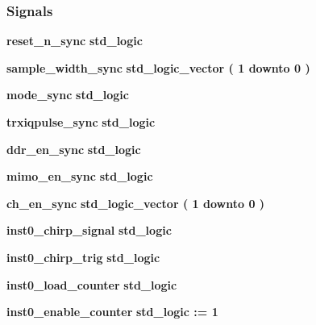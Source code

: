 \subsubsection*{Signals}
 \begin{DoxyCompactItemize}
\item 
{\bf reset\+\_\+n\+\_\+sync} {\bfseries \textcolor{comment}{std\+\_\+logic}\textcolor{vhdlchar}{ }} 
\item 
{\bf sample\+\_\+width\+\_\+sync} {\bfseries \textcolor{comment}{std\+\_\+logic\+\_\+vector}\textcolor{vhdlchar}{ }\textcolor{vhdlchar}{(}\textcolor{vhdlchar}{ }\textcolor{vhdlchar}{ } \textcolor{vhdldigit}{1} \textcolor{vhdlchar}{ }\textcolor{keywordflow}{downto}\textcolor{vhdlchar}{ }\textcolor{vhdlchar}{ } \textcolor{vhdldigit}{0} \textcolor{vhdlchar}{ }\textcolor{vhdlchar}{)}\textcolor{vhdlchar}{ }} 
\item 
{\bf mode\+\_\+sync} {\bfseries \textcolor{comment}{std\+\_\+logic}\textcolor{vhdlchar}{ }} 
\item 
{\bf trxiqpulse\+\_\+sync} {\bfseries \textcolor{comment}{std\+\_\+logic}\textcolor{vhdlchar}{ }} 
\item 
{\bf ddr\+\_\+en\+\_\+sync} {\bfseries \textcolor{comment}{std\+\_\+logic}\textcolor{vhdlchar}{ }} 
\item 
{\bf mimo\+\_\+en\+\_\+sync} {\bfseries \textcolor{comment}{std\+\_\+logic}\textcolor{vhdlchar}{ }} 
\item 
{\bf ch\+\_\+en\+\_\+sync} {\bfseries \textcolor{comment}{std\+\_\+logic\+\_\+vector}\textcolor{vhdlchar}{ }\textcolor{vhdlchar}{(}\textcolor{vhdlchar}{ }\textcolor{vhdlchar}{ } \textcolor{vhdldigit}{1} \textcolor{vhdlchar}{ }\textcolor{keywordflow}{downto}\textcolor{vhdlchar}{ }\textcolor{vhdlchar}{ } \textcolor{vhdldigit}{0} \textcolor{vhdlchar}{ }\textcolor{vhdlchar}{)}\textcolor{vhdlchar}{ }} 
\item 
{\bf inst0\+\_\+chirp\+\_\+signal} {\bfseries \textcolor{comment}{std\+\_\+logic}\textcolor{vhdlchar}{ }} 
\item 
{\bf inst0\+\_\+chirp\+\_\+trig} {\bfseries \textcolor{comment}{std\+\_\+logic}\textcolor{vhdlchar}{ }} 
\item 
{\bf inst0\+\_\+load\+\_\+counter} {\bfseries \textcolor{comment}{std\+\_\+logic}\textcolor{vhdlchar}{ }} 
\item 
{\bf inst0\+\_\+enable\+\_\+counter} {\bfseries \textcolor{comment}{std\+\_\+logic}\textcolor{vhdlchar}{ }\textcolor{vhdlchar}{ }\textcolor{vhdlchar}{\+:}\textcolor{vhdlchar}{=}\textcolor{vhdlchar}{ }\textcolor{vhdlchar}{ }\textcolor{vhdlchar}{\textquotesingle{}}\textcolor{vhdlchar}{ } \textcolor{vhdldigit}{1} \textcolor{vhdlchar}{ }\textcolor{vhdlchar}{\textquotesingle{}}\textcolor{vhdlchar}{ }} 

\end{DoxyCompactItemize}
